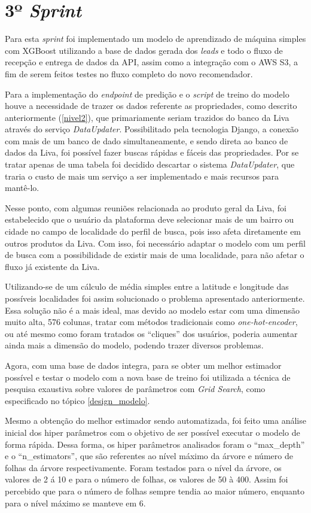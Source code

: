 \section{3º \textit{Sprint}}

Para esta \textit{sprint} foi implementado um modelo de aprendizado de máquina simples com XGBoost utilizando a base de dados gerada dos \textit{leads} e todo o fluxo de recepção e entrega de dados da API, assim como a integração com o AWS S3, a fim de serem feitos testes no fluxo completo do novo recomendador.

Para a implementação do \textit{endpoint} de predição e o \textit{script} de treino do modelo houve a necessidade de trazer os dados referente as propriedades, como descrito anteriormente (\ref{nivel2}), que primariamente seriam trazidos do banco da Liva através do serviço \textit{DataUpdater}. Possibilitado pela tecnologia Django, a conexão com mais de um banco de dado simultaneamente, e sendo direta ao banco de dados da Liva, foi possível fazer buscas rápidas e fáceis das propriedades. Por se tratar apenas de uma tabela foi decidido descartar o sistema \textit{DataUpdater}, que traria o custo de mais um serviço a ser implementado e mais recursos para mantê-lo.

Nesse ponto, com algumas reuniões relacionada ao produto geral da Liva, foi estabelecido que o usuário da plataforma deve selecionar mais de um bairro ou cidade no campo de localidade do perfil de busca, pois isso afeta diretamente em outros produtos da Liva. Com isso, foi necessário adaptar o modelo com um perfil de busca com a possibilidade de existir mais de uma localidade, para não afetar o fluxo já existente da Liva.

Utilizando-se de um cálculo de média simples entre a latitude e longitude das possíveis localidades foi assim solucionado o problema apresentado anteriormente. Essa solução não é a mais ideal, mas devido ao modelo estar com uma dimensão muito alta, 576 colunas, tratar com métodos tradicionais como \textit{one-hot-encoder}, ou até mesmo como foram tratados os “cliques'' dos usuários, poderia aumentar ainda mais a dimensão do modelo, podendo trazer diversos problemas.

Agora, com uma base de dados integra, para se obter um melhor estimador possível e testar o modelo com a nova base de treino foi utilizada a técnica de pesquisa exaustiva sobre valores de parâmetros com \textit{Grid Search}, como especificado no tópico \ref{design_modelo}.

Mesmo a obtenção do melhor estimador sendo automatizada, foi feito uma análise inicial dos hiper parâmetros com o objetivo de ser possível executar o modelo de forma rápida. Dessa forma, os hiper parâmetros analisados foram o “max\_depth'' e o “n\_estimators'', que são referentes ao nível máximo da árvore e número de folhas da árvore respectivamente. Foram testados para o nível da árvore, os valores de 2 á 10 e para o número de folhas, os valores de 50 à 400. Assim foi percebido que para o número de folhas sempre tendia ao maior número, enquanto para o nível máximo se manteve em 6.

